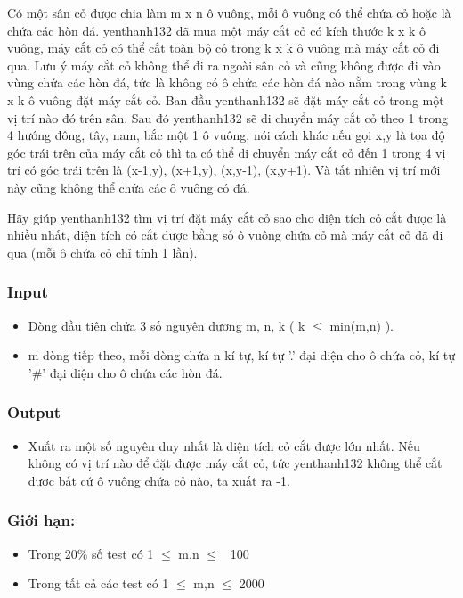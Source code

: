 



   Có một sân cỏ được chia làm m x n ô vuông, mỗi ô vuông có thể chứa cỏ hoặc là chứa các hòn đá.   yenthanh132   đã mua một máy cắt cỏ có kích thước k x k ô vuông, máy cắt cỏ có thể cắt toàn bộ cỏ trong k x k ô vuông mà máy cắt cỏ đi qua. Lưu ý máy cắt cỏ không thể đi ra ngoài sân cỏ và cũng không được đi vào vùng chứa các hòn đá, tức là không có ô chứa các hòn đá nào nằm trong vùng k x k ô vuông đặt máy cắt cỏ. Ban đầu   yenthanh132   sẽ đặt máy cắt cỏ trong một vị trí nào đó trên sân. Sau đó   yenthanh132   sẽ di chuyển máy cắt cỏ theo 1 trong 4 hướng đông, tây, nam, bắc một 1 ô vuông, nói cách khác nếu gọi x,y là tọa độ góc trái trên của máy cắt cỏ thì ta có thể di chuyển máy cắt cỏ đến 1 trong 4 vị trí có góc trái trên là (x-1,y), (x+1,y), (x,y-1), (x,y+1). Và tất nhiên vị trí mới này cũng không thể chứa các ô vuông có đá.  

   Hãy giúp   yenthanh132   tìm vị trí đặt máy cắt cỏ sao cho diện tích cỏ cắt được là nhiều nhất, diện tích có cắt được bằng số ô vuông chứa cỏ mà máy cắt cỏ đã đi qua (mỗi ô chứa cỏ chỉ tính 1 lần).  

\subsubsection{   Input  }
\begin{itemize}
	\item     Dòng đầu tiên chứa 3 số nguyên dương m, n, k ( k  $\le$  min(m,n) ).   
	\item     m dòng tiếp theo, mỗi dòng chứa n kí tự, kí tự '.' đại diện cho ô chứa cỏ, kí tự '\#' đại diện cho ô chứa các hòn đá.   
\end{itemize}

\subsubsection{   Output  }
\begin{itemize}
	\item     Xuất ra một số nguyên duy nhất là diện tích cỏ cắt được lớn nhất. Nếu không có vị trí nào để đặt được máy cắt cỏ, tức    yenthanh132    không thể cắt được bất cứ ô vuông chứa cỏ nào, ta xuất ra -1.   
\end{itemize}

\subsubsection{   Giới hạn:  }
\begin{itemize}
	\item     Trong 20\% số test có 1  $\le$  m,n  $\le$  100   
	\item     Trong tất cả các test có 1  $\le$  m,n  $\le$  2000   
\end{itemize}

